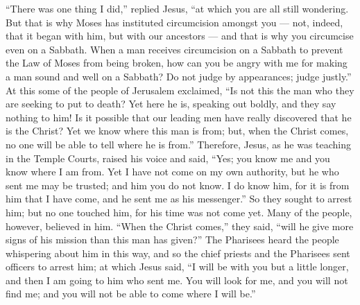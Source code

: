  ``There was one thing I did,'' replied Jesus, ``at which
you are all still wondering.  But that is why Moses has
instituted circumcision amongst you --- not, indeed, that it began with
him, but with our ancestors --- and that is why you circumcise even on a
Sabbath.  When a man receives circumcision on a Sabbath to
prevent the Law of Moses from being broken, how can you be angry with me
for making a man sound and well on a Sabbath?  Do not judge
by appearances; judge justly.''  At this some of the people
of Jerusalem exclaimed, ``Is not this the man who they are seeking to
put to death?  Yet here he is, speaking out boldly, and
they say nothing to him! Is it possible that our leading men have really
discovered that he is the Christ?  Yet we know where this
man is from; but, when the Christ comes, no one will be able to tell
where he is from.''  Therefore, Jesus, as he was teaching
in the Temple Courts, raised his voice and said, ``Yes; you know me and
you know where I am from. Yet I have not come on my own authority, but
he who sent me may be trusted; and him you do not know.  I
do know him, for it is from him that I have come, and he sent me as his
messenger.''  So they sought to arrest him; but no one
touched him, for his time was not come yet.  Many of the
people, however, believed in him. ``When the Christ comes,'' they said,
``will he give more signs of his mission than this man has given?''
 The Pharisees heard the people whispering about him in
this way, and so the chief priests and the Pharisees sent officers to
arrest him;  at which Jesus said, ``I will be with you but
a little longer, and then I am going to him who sent me. 
You will look for me, and you will not find me; and you will not be able
to come where I will be.''

